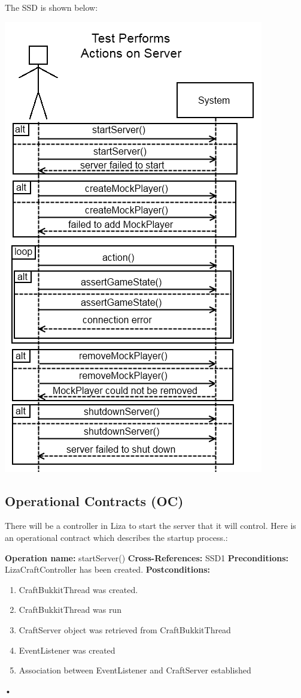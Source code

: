 \documentclass{article}
\begin{document}
\noindent  The SSD is shown below:

\includegraphics{ssd}


\subsection{Operational Contracts (OC)}

There will be a controller in Liza to start the server that it will control.
 Here is an operational contract which describes the startup process.:  \newline

\textbf{Operation name:} startServer() 
\newline \indent
\textbf{Cross-References:} SSD1 
\newline  \indent
\textbf{Preconditions:} LizaCraftController has been created.
\newline  \indent
\textbf{Postconditions: }
	\begin{enumerate}
		\item CraftBukkitThread was created.
		\item CraftBukkitThread was run
		\item CraftServer object was retrieved from CraftBukkitThread
		\item EventListener was created
		\item Association between EventListener and CraftServer established
	\end{enumerate}•
\end{document}
